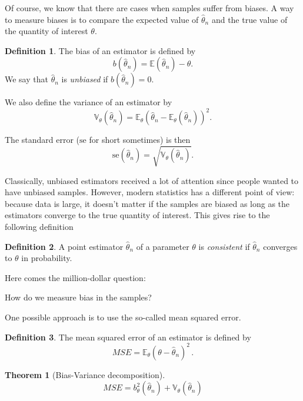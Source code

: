 \documentclass[
  openany]{book}
\newtheorem{theorem}{Theorem}[chapter]
\theoremstyle{definition}
\newtheorem{definition}{Definition}[chapter]
\theoremstyle{definition}
\theoremstyle{definition}
\theoremstyle{definition}
\theoremstyle{remark}
\begin{document}
Of course, we know that there are cases when samples suffer from biases.
A way to measure biases is to compare the expected value of \(\hat \theta_n\) and
the true value of the quantity of interest \(\theta\).

\begin{definition}
The bias of an estimator is defined by
\[ b(\hat \theta_n) = \mathbb{E}(\hat \theta_n) - \theta. \]
We say that \(\hat \theta_n\) is \emph{unbiased} if \(b(\hat \theta_n) = 0\).

We also define the variance of an estimator by
\[ \mathbb{V}_\theta(\hat \theta_n) = \mathbb{E}_\theta (\hat \theta_n - \mathbb{E}_\theta (\hat \theta_n))^2 .\]

The standard error (\(\mathrm{se}\) for short sometimes) is then
\[ \mathrm{se}(\hat \theta_n) = \sqrt{\mathbb{V}_\theta (\hat \theta_n)}. \]
\end{definition}

Classically, unbiased estimators received a lot of attention since people
wanted to have unbiased samples.
However, modern statistics has a different point of view: because data
is large, it doesn't matter if the samples are biased as long as the
estimators converge to the true quantity of interest.
This gives rise to the following definition

\begin{definition}
A point estimator \(\hat \theta_n\) of a parameter \(\theta\) is \emph{consistent}
if \(\hat \theta_n\) converges to \(\theta\) in probability.
\end{definition}

Here comes the million-dollar question:

\begin{bbox}

How do we measure bias in the samples?

\end{bbox}

One possible approach is to use the so-called mean squared error.

\begin{definition}
The mean squared error of an estimator is defined by
\[ MSE = \mathbb{E}_\theta (\theta - \hat \theta_n)^2 \,.\]
\end{definition}

\begin{theorem}[Bias-Variance decomposition]
\[ MSE = b_\theta^2(\hat \theta_n) + \mathbb{V}_\theta(\hat \theta_n) \]
\end{theorem}
\end{document}
